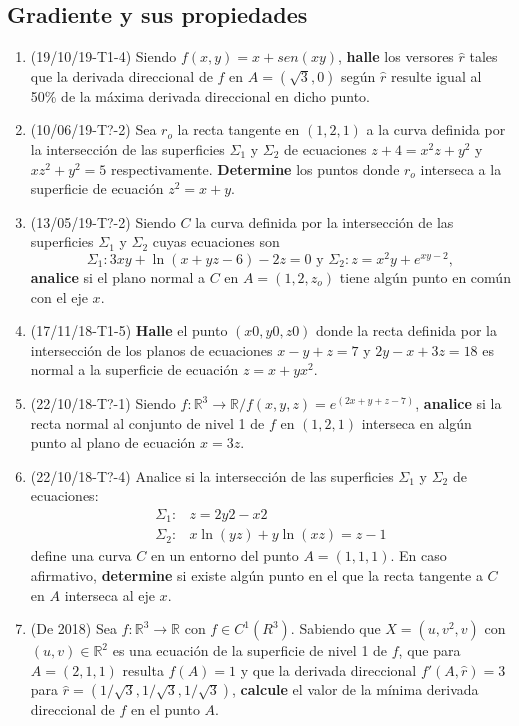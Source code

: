 \documentclass[12pt,a4paper]{article}
\renewcommand{\b}[1]{\textbf{#1}}
\newcommand{\R}{\mathbb{R}}
\begin{document}
\subsection{Gradiente y sus propiedades}
\begin{enumerate}
	\item (19/10/19-T1-4) Siendo $ f ( x, y ) = x + sen ( x y )  $, \b{halle} los versores $ \hat{r} $ tales que la derivada direccional de $ f $ en $ A = ( \sqrt{3}, 0 ) $ según $\hat{r}$ resulte igual al 50\% de la máxima derivada direccional en dicho punto.
	
	\item (10/06/19-T?-2) Sea $ r_o $ la recta tangente en $ ( 1, 2, 1 ) $ a la curva definida por la intersección de las superficies $ \Sigma_1 $ y $ \Sigma_2 $ de ecuaciones $ z + 4 = x^2 z + y^2 $ y $ x z^2 + y^2 = 5 $ respectivamente. \b{Determine} los puntos donde $ r_o $ interseca a la superficie de ecuación $ z^2 = x + y  $.
	
	\item (13/05/19-T?-2) Siendo $ C $ la curva definida por la intersección de las superficies  $ \Sigma_1 $ y $ \Sigma_2 $ cuyas ecuaciones son
	\[\Sigma_1 : 3 x y + \ln( x + y z - 6 ) - 2 z = 0 \text{ y } \Sigma_2 : z = x^2 y + e^{	x y - 2},\]
	\b{analice} si el plano normal a $ C $ en $ A = ( 1, 2, z_o ) $ tiene algún punto en común con el eje $ x  $.
	
	\item (17/11/18-T1-5) \b{Halle} el punto $ ( x 0, y 0, z 0 ) $ donde la recta definida por la intersección de los planos de ecuaciones $ x - y + z = 7 $ y $ 2 y - x + 3 z = 18 $ es normal a la superficie de ecuación $ z = x + y x^2  $.
	
	\item (22/10/18-T?-1) Siendo $ f : \R^3\rightarrow\R / f ( x, y, z ) = e^{(2x+y+z-7)}$, \b{analice} si la recta normal al conjunto de nivel 1 de $ f $ en $ ( 1, 2, 1 ) $ interseca en algún punto al plano de ecuación $ x = 3 z  $.
	
	\item (22/10/18-T?-4) Analice si la intersección de las superficies $\Sigma_1$ y $ \Sigma_2 $ de ecuaciones:
	\begin{align}
		\Sigma_1 :& z = 2 y 2 - x 2\\
		\Sigma_2 :& x \ln( y z ) + y \ln( x z ) = z - 1
	\end{align}
	define una curva $ C $ en un entorno del punto $ A = ( 1, 1, 1 )  $. En caso afirmativo, \b{determine} si existe algún punto en el que la recta tangente a $ C $ en $ A $ interseca al eje $ x  $.
	
	\item (De 2018) Sea $ f : \R^3\rightarrow \R $ con $ f \in C^1 (R^3)$. Sabiendo que $ X = (u, v^2, v) $ con $ (u, v) \in \R^2 $ es una ecuación de la superficie de nivel 1 de $ f $, que para $ A = (2, 1, 1) $ resulta $ f(A) = 1 $ y que la derivada direccional $ f'(A, \hat{r}) = 3 $ para $ \hat{r}=(1/\sqrt{ 3}, 1/\sqrt{ 3}, 1/\sqrt{ 3}) $, \b{calcule}  el valor de la mínima derivada direccional de $ f $ en el punto $ A $.
\end{enumerate}
\end{document}

